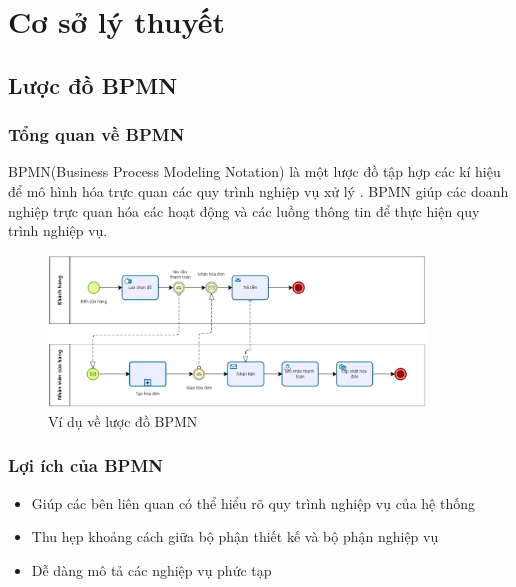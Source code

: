 \section{Cơ sở lý thuyết}
\subsection{Lược đồ BPMN}
\subsubsection{Tổng quan về BPMN}
\hspace*{0.5cm}BPMN(Business Process Modeling Notation) là một lược đồ tập hợp các kí hiệu để mô hình hóa trực quan các quy trình nghiệp vụ xử lý . BPMN giúp các doanh nghiệp trực quan hóa các hoạt động và các luồng thông tin để thực hiện quy trình nghiệp vụ.
\begin{figure}[!htp]
    \centering
    \includegraphics[width=10cm]{img/theory/BPMN/BPMN_sample.png}
    \newline
    \caption{Ví dụ về lược đồ BPMN}
\end{figure}
 
 
 
\subsubsection{Lợi ích của BPMN}
\begin{itemize}
    \item Giúp các bên liên quan có thể hiểu rõ quy trình nghiệp vụ của hệ thống
    \item Thu hẹp khoảng cách giữa bộ phận thiết kế và bộ phận nghiệp vụ
    \item Dễ dàng mô tả các nghiệp vụ phức tạp
\end{itemize}
 
